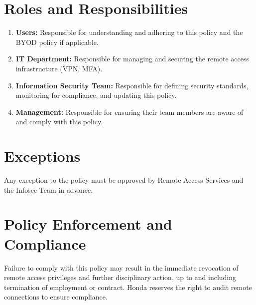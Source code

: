 \section{Roles and Responsibilities}
\begin{enumerate}
    \item \textbf{Users:} Responsible for understanding and adhering to this policy and the BYOD policy if applicable.
    \item \textbf{IT Department:} Responsible for managing and securing the remote access infrastructure (VPN, MFA).
    \item \textbf{Information Security Team:} Responsible for defining security standards, monitoring for compliance, and updating this policy.
    \item \textbf{Management:} Responsible for ensuring their team members are aware of and comply with this policy.
\end{enumerate}

\section{Exceptions}
Any exception to the policy must be approved by Remote Access Services and the Infosec Team in advance.

\section{Policy Enforcement and Compliance}
Failure to comply with this policy may result in the immediate revocation of remote access privileges and further disciplinary action, up to and including termination of employment or contract. Honda reserves the right to audit remote connections to ensure compliance.